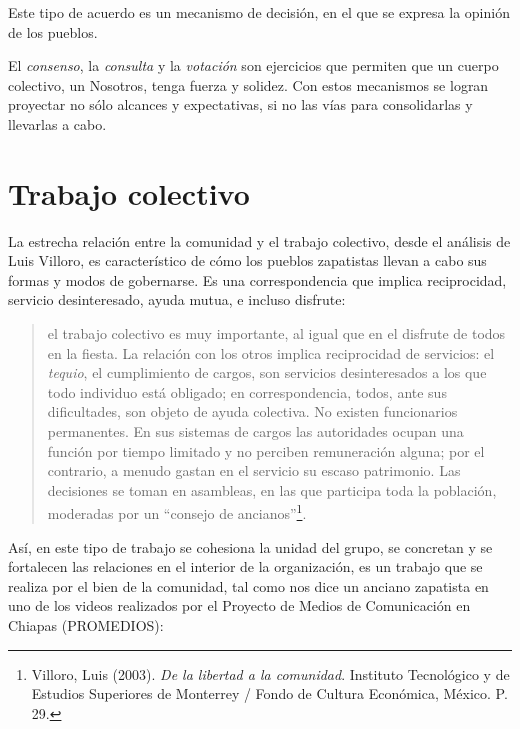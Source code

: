 \documentclass[oneside]{book}
\begin{document}
Este tipo de acuerdo es un mecanismo de decisión, en el que se expresa la opinión de los pueblos.

El \textit{consenso}, la \textit{consulta} y la \textit{votación} son ejercicios que permiten  que un cuerpo colectivo, un Nosotros, tenga fuerza y solidez. Con estos mecanismos se logran proyectar no sólo alcances y expectativas, si no las vías para consolidarlas y llevarlas a cabo.
	
\section{Trabajo colectivo}

La estrecha relación entre la comunidad y el trabajo colectivo, desde el análisis de Luis Villoro, es característico de cómo los pueblos zapatistas llevan a cabo sus formas y modos de gobernarse. Es una correspondencia que implica reciprocidad, servicio desinteresado, ayuda mutua, e incluso disfrute:
\begin{quote}
	el trabajo colectivo es muy importante, al igual que en el disfrute de todos en la fiesta. La relación con los otros implica reciprocidad de servicios: el \textit{tequio}, el cumplimiento de cargos, son servicios desinteresados a los que todo individuo está obligado; en correspondencia, todos, ante sus dificultades, son objeto de ayuda colectiva. No existen funcionarios permanentes. En sus sistemas de cargos las autoridades ocupan una función por tiempo limitado y no perciben remuneración alguna; por el contrario, a menudo gastan en el servicio su escaso patrimonio. Las decisiones se toman en asambleas, en las que participa toda la población, moderadas por un “consejo de ancianos”\footnote{Villoro, Luis (2003). \textit{De la libertad a la comunidad}. Instituto Tecnológico y de Estudios Superiores de Monterrey / Fondo de Cultura Económica, México. P. 29.}.
\end{quote}

Así, en este tipo de trabajo se cohesiona la unidad del grupo, se concretan y se fortalecen las relaciones en el interior de la organización, es un trabajo que se realiza por el bien de la comunidad, tal como nos dice un anciano zapatista en uno de los videos realizados por el Proyecto de Medios de Comunicación en Chiapas (PROMEDIOS): 
\end{document}
